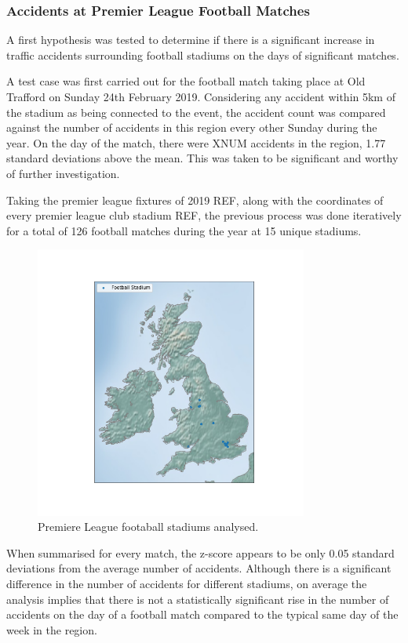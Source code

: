 \documentclass[12pt]{article}
\begin{document}
\subsubsection{Accidents at Premier League Football Matches}


A first hypothesis was tested to determine if there is a significant increase in traffic accidents surrounding football stadiums on the days of significant matches.

A test case was first carried out for the football match taking place at Old Trafford on Sunday 24th February 2019. Considering any accident within 5km of the stadium as being connected to the event, the accident count was compared against the number of accidents in this region every other Sunday during the year. On the day of the match, there were XNUM accidents in the region, 1.77 standard deviations above the mean. This was taken to be significant and worthy of further investigation.

Taking the premier league fixtures of 2019 REF, along with the coordinates of every premier league club stadium REF, the previous process was done iteratively for a total of 126 football matches during the year at 15 unique stadiums.

\begin{figure}[h]
\centering     %
\includegraphics[width=0.80\textwidth]{stadiums}
\caption{Premiere League footaball stadiums analysed.}
\end{figure}

When summarised for every match, the z-score appears to be only 0.05 standard deviations from the average number of accidents. Although there is a significant difference in the number of accidents for different stadiums, on average the analysis implies that there is not a statistically significant rise in the number of accidents on the day of a football match compared to the typical same day of the week in the region.
\end{document}
